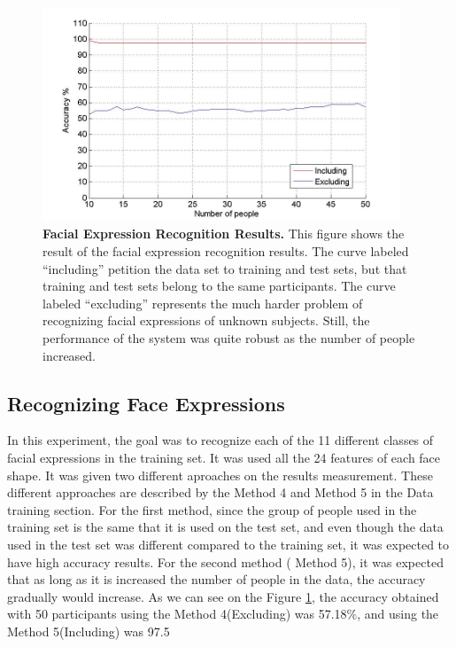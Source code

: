 \documentclass[]{article}
\begin{document}
\begin{figure}[ht]
\begin{center}
\vspace{-3mm}
\includegraphics[width=0.95\textwidth]{figures/figureRecognizeFacialExpressionTrue.jpg}
\end{center}
\caption{\textbf{Facial Expression Recognition Results.} This figure shows the result of the facial expression recognition results.
The curve labeled ``including'' petition the data set to training and test sets, but that training and test sets belong to the same participants.
The curve labeled ``excluding'' represents the much harder problem of recognizing facial expressions of unknown subjects. Still, 
the performance of the system was quite robust as the number of people increased.}
\label{identityRecognition}
\end{figure}

\subsection{Recognizing Face Expressions}

In this experiment, the goal was to recognize each of the 11 different classes
of facial expressions in the training set. It was used all the 24 features of
each face shape. It was given two different aproaches on the results
measurement. These different approaches are described by the Method 4 and
Method 5 in the Data training section.
For the first method, since the group of people used in the training set is the
same that it is used on the test set, and even though the data used in the test
set was different compared to the training set, it was expected to have high
accuracy results.
For the second method ( Method 5), it was expected that as long as it is
increased the number of people in the data, the accuracy gradually would increase.
As we can see on the Figure \ref{identityRecognition}, the accuracy obtained
with 50 participants using the Method 4(Excluding) was 57.18\%, and using the
Method 5(Including) was 97.5%
 
\end{document}
